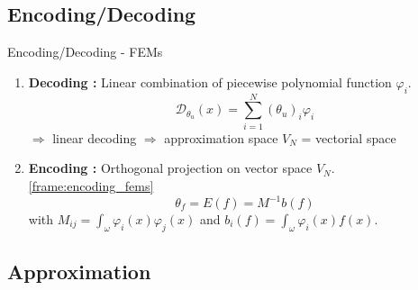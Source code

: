 \subsection{Encoding/Decoding}

\begin{frame}{Encoding/Decoding - FEMs}
	\begin{enumerate}[\textbullet]
		\item \textbf{Decoding :} Linear combination of piecewise polynomial function $\varphi_i$.
		\begin{equation*}
			\mathcal{D}_{\theta_u}(x) = \sum_{i=1}^{N}(\theta_u)_i\varphi_i
		\end{equation*}
		$\Rightarrow$ linear decoding $\Rightarrow$ approximation space $V_N$ = vectorial space
		\item \textbf{Encoding :} Orthogonal projection on vector space $V_N$.   \ref{frame:encoding_fems}
		\begin{equation*}
			\theta_f=E(f)=M^{-1}b(f)
		\end{equation*}
		with $M_{ij}=\int_\omega \varphi_i(x)\varphi_j(x)$ and $b_i(f)=\int_\omega \varphi_i(x)f(x)$.
	\end{enumerate}
\end{frame}

\subsection{Approximation}